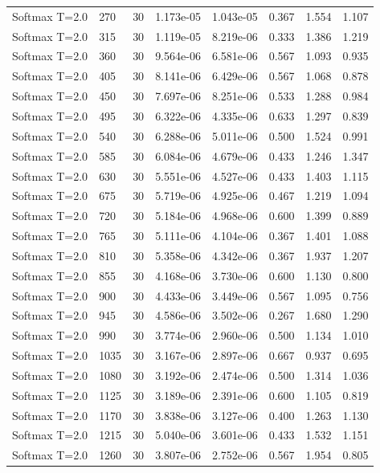 \begin{scriptsize}
\begin{longtable}{llrrrrrr}
Softmax T=2.0 & 270 & 30 & 1.173e-05 & 1.043e-05 & 0.367 & 1.554 & 1.107 \\
Softmax T=2.0 & 315 & 30 & 1.119e-05 & 8.219e-06 & 0.333 & 1.386 & 1.219 \\
Softmax T=2.0 & 360 & 30 & 9.564e-06 & 6.581e-06 & 0.567 & 1.093 & 0.935 \\
Softmax T=2.0 & 405 & 30 & 8.141e-06 & 6.429e-06 & 0.567 & 1.068 & 0.878 \\
Softmax T=2.0 & 450 & 30 & 7.697e-06 & 8.251e-06 & 0.533 & 1.288 & 0.984 \\
Softmax T=2.0 & 495 & 30 & 6.322e-06 & 4.335e-06 & 0.633 & 1.297 & 0.839 \\
Softmax T=2.0 & 540 & 30 & 6.288e-06 & 5.011e-06 & 0.500 & 1.524 & 0.991 \\
Softmax T=2.0 & 585 & 30 & 6.084e-06 & 4.679e-06 & 0.433 & 1.246 & 1.347 \\
Softmax T=2.0 & 630 & 30 & 5.551e-06 & 4.527e-06 & 0.433 & 1.403 & 1.115 \\
Softmax T=2.0 & 675 & 30 & 5.719e-06 & 4.925e-06 & 0.467 & 1.219 & 1.094 \\
Softmax T=2.0 & 720 & 30 & 5.184e-06 & 4.968e-06 & 0.600 & 1.399 & 0.889 \\
Softmax T=2.0 & 765 & 30 & 5.111e-06 & 4.104e-06 & 0.367 & 1.401 & 1.088 \\
Softmax T=2.0 & 810 & 30 & 5.358e-06 & 4.342e-06 & 0.367 & 1.937 & 1.207 \\
Softmax T=2.0 & 855 & 30 & 4.168e-06 & 3.730e-06 & 0.600 & 1.130 & 0.800 \\
Softmax T=2.0 & 900 & 30 & 4.433e-06 & 3.449e-06 & 0.567 & 1.095 & 0.756 \\
Softmax T=2.0 & 945 & 30 & 4.586e-06 & 3.502e-06 & 0.267 & 1.680 & 1.290 \\
Softmax T=2.0 & 990 & 30 & 3.774e-06 & 2.960e-06 & 0.500 & 1.134 & 1.010 \\
Softmax T=2.0 & 1035 & 30 & 3.167e-06 & 2.897e-06 & 0.667 & 0.937 & 0.695 \\
Softmax T=2.0 & 1080 & 30 & 3.192e-06 & 2.474e-06 & 0.500 & 1.314 & 1.036 \\
Softmax T=2.0 & 1125 & 30 & 3.189e-06 & 2.391e-06 & 0.600 & 1.105 & 0.819 \\
Softmax T=2.0 & 1170 & 30 & 3.838e-06 & 3.127e-06 & 0.400 & 1.263 & 1.130 \\
Softmax T=2.0 & 1215 & 30 & 5.040e-06 & 3.601e-06 & 0.433 & 1.532 & 1.151 \\
Softmax T=2.0 & 1260 & 30 & 3.807e-06 & 2.752e-06 & 0.567 & 1.954 & 0.805 \\

\end{longtable}
\end{scriptsize}
